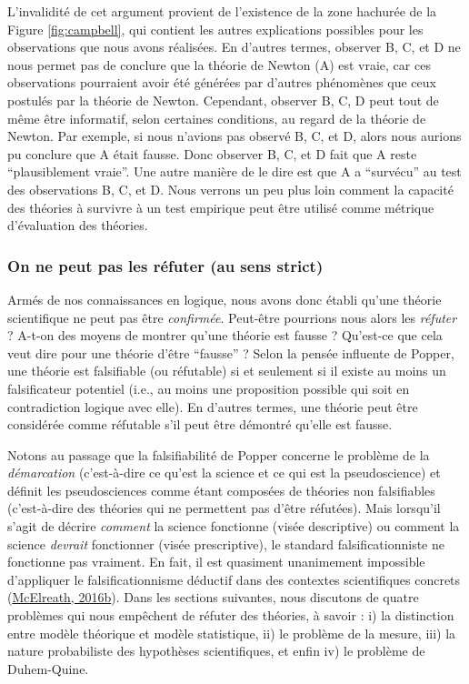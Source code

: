 \documentclass[
  a4paper,11pt,twoside,onecolumn,openright,final,oldfontcommands]{memoir}
\theoremstyle{definition}
\theoremstyle{definition}
\theoremstyle{definition}
\theoremstyle{definition}
\theoremstyle{remark}
\begin{document}
L'invalidité de cet argument provient de l'existence de la zone hachurée de la Figure \ref{fig:campbell}, qui contient les autres explications possibles pour les observations que nous avons réalisées. En d'autres termes, observer B, C, et D ne nous permet pas de conclure que la théorie de Newton (A) est vraie, car ces observations pourraient avoir été générées par d'autres phénomènes que ceux postulés par la théorie de Newton. Cependant, observer B, C, D peut tout de même être informatif, selon certaines conditions, au regard de la théorie de Newton. Par exemple, si nous n'avions pas observé B, C, et D, alors nous aurions pu conclure que A était fausse. Donc observer B, C, et D fait que A reste ``plausiblement vraie''. Une autre manière de le dire est que A a ``survécu'' au test des observations B, C, et D. Nous verrons un peu plus loin comment la capacité des théories à survivre à un test empirique peut être utilisé comme métrique d'évaluation des théories.

\hypertarget{on-ne-peut-pas-les-ruxe9futer-au-sens-strict}{%
\subsubsection{On ne peut pas les réfuter (au sens strict)}\label{on-ne-peut-pas-les-ruxe9futer-au-sens-strict}}

Armés de nos connaissances en logique, nous avons donc établi qu'une théorie scientifique ne peut pas être \emph{confirmée}. Peut-être pourrions nous alors les \emph{réfuter} ? A-t-on des moyens de montrer qu'une théorie est fausse ? Qu'est-ce que cela veut dire pour une théorie d'être ``fausse'' ? Selon la pensée influente de Popper, une théorie est falsifiable (ou réfutable) si et seulement si il existe au moins un falsificateur potentiel (i.e., au moins une proposition possible qui soit en contradiction logique avec elle). En d'autres termes, une théorie peut être considérée comme réfutable s'il peut être démontré qu'elle est fausse.

Notons au passage que la falsifiabilité de Popper concerne le problème de la \emph{démarcation} (c'est-à-dire ce qu'est la science et ce qui est la pseudoscience) et définit les pseudosciences comme étant composées de théories non falsifiables (c'est-à-dire des théories qui ne permettent pas d'être réfutées). Mais lorsqu'il s'agit de décrire \emph{comment} la science fonctionne (visée descriptive) ou comment la science \emph{devrait} fonctionner (visée prescriptive), le standard falsificationniste ne fonctionne pas vraiment. En fait, il est quasiment unanimement impossible d'appliquer le falsificationnisme déductif dans des contextes scientifiques concrets (\protect\hyperlink{ref-mcelreath_statistical_2016}{McElreath, 2016b}). Dans les sections suivantes, nous discutons de quatre problèmes qui nous empêchent de réfuter des théories, à savoir : i) la distinction entre modèle théorique et modèle statistique, ii) le problème de la mesure, iii) la nature probabiliste des hypothèses scientifiques, et enfin iv) le problème de Duhem-Quine.
\end{document}
